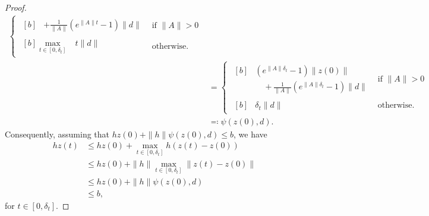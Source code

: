\documentclass{IEEEtran}
\begin{document}
\begin{appendices}
\begin{proof}
\begin{align*}
\begin{cases}
\begin{aligned}[b]
            &+\!\frac{1}{\|A\|}(e^{\|A\|t}\!-\!1)\|d\|
            \end{aligned}
            &\text{if } \|A\|\!>\!0 \\
            \begin{aligned}[b]
            \max_{t\in[0,\delta_t]}& t \|d\|
            \end{aligned}
            &\text{otherwise.}
        \end{cases}
        \\&
        =\begin{cases}
            \begin{aligned}[b]
            &(e^{\|A\|\delta_t}-1)\|z(0)\| \\
            &\quad\!+\!\frac{1}{\|A\|}(e^{\|A\|\delta_t}\!-\!1)\|d\|
            \end{aligned}
            &\text{if } \|A\|\!>\!0 \\
            \begin{aligned}[b]
            &\delta_t \|d\|
            \end{aligned}
            &\text{otherwise.}
        \end{cases}\\
        &\eqqcolon \psi(z(0),d).
    \end{align*}
    Consequently, assuming that $hz(0)+\|h\|\psi(z(0),d) \leq b$, we have
    \begin{align*}
    	hz(t) &\leq hz(0) + \max_{t\in[0,\delta_t]}h(z(t)-z(0)) 
    	\\&\leq hz(0) + \|h\|\max_{t\in[0,\delta_t]}\|z(t)-z(0)\| 
    	\\&\leq  hz(0)+\|h\|\psi(z(0),d)  
    	\\&\leq b,
    \end{align*} 
    for $t\in[0,\delta_t]$.
\end{proof}


\end{appendices}
\end{document}
